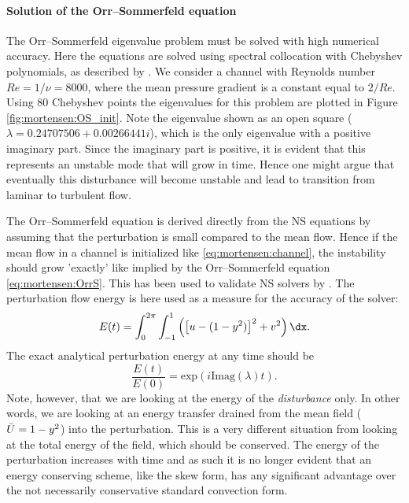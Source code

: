 \paragraph{Solution of the Orr--Sommerfeld equation}

The Orr--Sommerfeld eigenvalue problem must be solved with high numerical
accuracy. Here the equations are solved using spectral collocation
with Chebyshev polynomials, as described by \citet{Trefethen2006}. We
consider a channel with Reynolds number $Re=1/\nu=8000$, where
the mean pressure gradient is a constant equal to $2/Re$. Using 80
Chebyshev points the eigenvalues for this problem are plotted in Figure
\ref{fig:mortensen:OS_init}. Note the eigenvalue shown as an open
square ($\lambda =
0.24707506 + 0.00266441 i$), which is the only eigenvalue with a positive
imaginary part. Since the imaginary part is positive, it is evident that
this represents an unstable mode that will grow in time.
Hence one might argue that eventually this disturbance will become
unstable and lead to transition from laminar to turbulent flow.

The Orr--Sommerfeld equation is derived directly from the NS
equations by assuming that the perturbation is small compared to the
mean flow. Hence if the mean flow in a channel is initialized like
\eqref{eq:mortensen:channel}, the instability should grow 'exactly' like
implied by the Orr--Sommerfeld equation \eqref{eq:mortensen:OrrS}. This
has been used to validate NS solvers by \citet{MalikZangHussaini1984}. The
perturbation flow energy is here used as a measure for the accuracy of
the solver:
\begin{equation}
  E(t)= \int_0^{2\pi}\int_{-1}^{1} \left( \left[u-(1-y^2)\right]^2
    + v^2 \right) \dx.
\end{equation}
The exact analytical perturbation energy at any time should be
\begin{equation}
 \frac{E(t)}{E(0)}=\text{exp}(i \text{Imag}(\lambda) t).
\end{equation}
Note, however, that we are looking at the energy of the
\textit{disturbance} only. In other words, we are looking at an
energy transfer drained from the mean field ($\Bar{U}=1-y^2$) into
the perturbation. This is a very different situation from looking at
the total energy of the field, which should be conserved. The energy of
the perturbation increases with time and as such it is no longer evident
that an energy conserving scheme, like the skew form, has any significant
advantage over the not necessarily conservative standard convection form.

